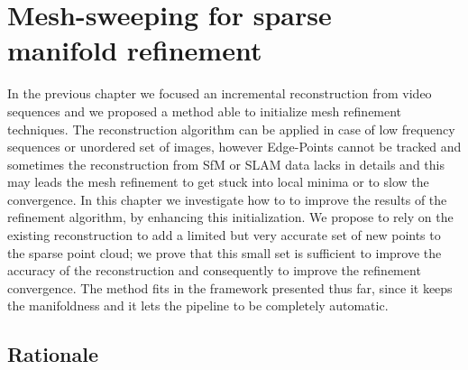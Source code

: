 \chapter[Mesh-sweeping for sparse manifold refinement]{Mesh-sweeping for sparse \\manifold refinement}
\label{ch:sweeping}


\begin{mdframed}[hidealllines=true,backgroundcolor=blue!20]
In the previous chapter we focused an incremental reconstruction from video sequences and we proposed a method able to initialize mesh refinement techniques. 
The reconstruction algorithm can be applied in case of low frequency sequences or unordered set of images, however Edge-Points cannot be tracked and sometimes the reconstruction from SfM or SLAM data lacks in details and this may leads the mesh refinement to get stuck into local minima or to slow the convergence.
In this chapter we investigate how to to improve the results of the refinement algorithm, by enhancing this initialization. 
We propose to rely on the existing reconstruction to add a limited but very accurate set of new points to the sparse point cloud; we prove that this small set is sufficient to improve the accuracy of the reconstruction and consequently to improve the refinement convergence. 
The method fits in the framework presented thus far, since it keeps the manifoldness and it lets the pipeline to be completely automatic.

\end{mdframed}
\minitoc
\newpage

\section{Rationale}


